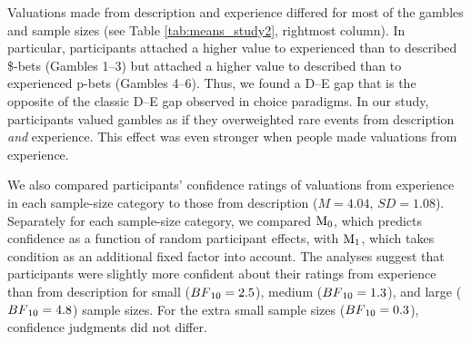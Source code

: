 \documentclass[a4paper, man, floatsintext]{apa6}
\begin{document}
Valuations made from description and experience differed for most of the
gambles and sample sizes (see Table \ref{tab:means_study2}, rightmost
column). In particular, participants attached a higher value to
experienced than to described \$-bets (Gambles 1--3) but attached a
higher value to described than to experienced p-bets (Gambles 4--6).
Thus, we found a D--E gap that is the opposite of the classic D--E gap
observed in choice paradigms. In our study, participants valued gambles
as if they overweighted rare events from description \textit{and}
experience. This effect was even stronger when people made valuations
from experience.

We also compared participants' confidence ratings of valuations from
experience in each sample-size category to those from description
(\(M = 4.04\), \(SD = 1.08\)). Separately for each sample-size category,
we compared \(\mathrm{M}\textsubscript{0}\), which predicts confidence
as a function of random participant effects, with
\(\mathrm{M}\textsubscript{1}\), which takes condition as an additional
fixed factor into account. The analyses suggest that participants were
slightly more confident about their ratings from experience than from
description for small (\(BF\textsubscript{10} = 2.5\)), medium
(\(BF\textsubscript{10} = 1.3\)), and large
(\(BF\textsubscript{10} = 4.8\)) sample sizes. For the extra small
sample sizes (\(BF\textsubscript{10} = 0.3\)), confidence judgments did
not differ.
\end{document}
